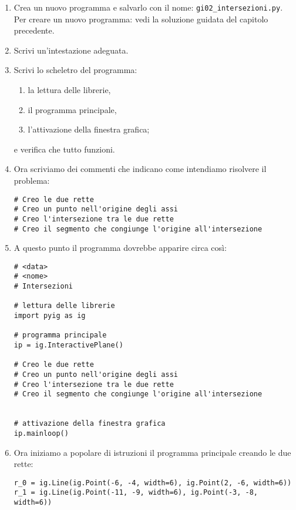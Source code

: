 \begin{enumerate} [noitemsep]

\item Crea un nuovo programma e salvarlo con il nome: 
\texttt{gi02\_intersezioni.py}.
Per creare un nuovo programma: vedi la soluzione guidata del capitolo
precedente.

\item Scrivi un'intestazione adeguata.

\item Scrivi lo scheletro del programma:

\begin{enumerate} [noitemsep]
\item la lettura delle librerie,
\item il programma principale,
\item l'attivazione della finestra grafica;
\end{enumerate}

e verifica che tutto funzioni.

\item Ora scriviamo dei commenti che indicano come intendiamo risolvere il
problema:

\begin{lstlisting}
# Creo le due rette
# Creo un punto nell'origine degli assi
# Creo l'intersezione tra le due rette
# Creo il segmento che congiunge l'origine all'intersezione
\end{lstlisting}

\item A questo punto il programma dovrebbe apparire circa così:

\begin{lstlisting}
# <data>
# <nome>
# Intersezioni

# lettura delle librerie
import pyig as ig

# programma principale
ip = ig.InteractivePlane()

# Creo le due rette
# Creo un punto nell'origine degli assi
# Creo l'intersezione tra le due rette
# Creo il segmento che congiunge l'origine all'intersezione


# attivazione della finestra grafica
ip.mainloop()
\end{lstlisting}

\item Ora iniziamo a popolare di istruzioni il programma principale creando le
due rette:

\begin{lstlisting}
r_0 = ig.Line(ig.Point(-6, -4, width=6), ig.Point(2, -6, width=6))
r_1 = ig.Line(ig.Point(-11, -9, width=6), ig.Point(-3, -8, width=6))
\end{lstlisting}


\end{enumerate}
